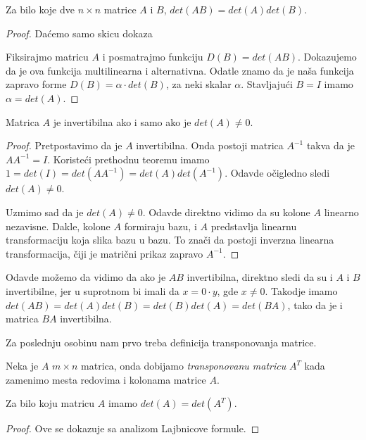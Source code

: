 \documentclass{article}
\begin{document}
\begin{theorem}
  Za bilo koje dve $n \times n$ matrice $A$ i $B$, $det(AB) = det(A)det(B)$.
\end{theorem}

\begin{proof}
  Daćemo samo skicu dokaza

  Fiksirajmo matricu $A$ i posmatrajmo funkciju $D(B) = det(AB)$.
  Dokazujemo da je ova funkcija multilinearna i alternativna.
  Odatle znamo da je naša funkcija zapravo forme $D(B) = \alpha \cdot det(B)$, za neki skalar $\alpha$.
  Stavljajući $B = I$ imamo $\alpha = det(A)$.
\end{proof}

\begin{theorem}
  Matrica $A$ je invertibilna ako i samo ako je $det(A) \neq 0$.
\end{theorem}

\begin{proof}
  Pretpostavimo da je $A$ invertibilna.
  Onda postoji matrica $A^{-1}$ takva da je $AA^{-1} = I$.
  Koristeći prethodnu teoremu imamo $1 = det(I) = det(AA^{-1}) = det(A)det(A^{-1})$.
  Odavde očigledno sledi $det(A) \neq 0$.


  Uzmimo sad da je $det(A) \neq 0$.
  Odavde direktno vidimo da su kolone $A$ linearno nezavisne.
  Dakle, kolone $A$ formiraju bazu, i $A$ predstavlja linearnu transformaciju koja slika bazu u bazu.
  To znači da postoji inverzna linearna transformacija, čiji je matrični prikaz zapravo $A^{-1}$.
\end{proof}

Odavde možemo da vidimo da ako je $AB$ invertibilna, direktno sledi da su i $A$ i $B$ invertibilne, jer u suprotnom bi imali da $x = 0 \cdot y$, gde $x \neq 0$.
Takodje imamo $det(AB) = det(A)det(B) = det(B)det(A) = det(BA)$, tako da je i matrica $BA$ invertibilna.

Za poslednju osobinu nam prvo treba definicija transponovanja matrice.

\begin{definition}
  Neka je $A$ $m \times n$ matrica, onda dobijamo \textit{transponovanu matricu} $A^T$ kada zamenimo mesta redovima i kolonama matrice $A$.
\end{definition}

\begin{theorem}
  Za bilo koju matricu $A$ imamo $det(A) = det(A^T)$.
\end{theorem}

\begin{proof}
  Ove se dokazuje sa analizom Lajbnicove formule.
\end{proof}
\end{document}
